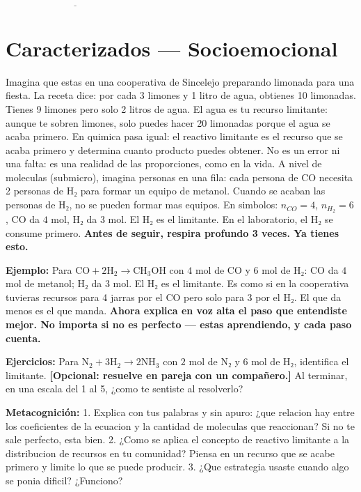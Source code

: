 \documentclass[
  spanish,
  letterpaper,
  12pt,
  oneside,
  open=any]{scrbook}
\newcommand{\setcolorsection}[2]{%
  \definecolor{currentsectionbg}{HTML}{#1}%
  \definecolor{currentsectionborder}{HTML}{#2}%
}
\begin{document}
\(\underline{\hspace{6cm}}\)

\setcolorsection{d6c7e7}{c0b0d8}

\section{Caracterizados ---
Socioemocional}\label{caracterizados-socioemocional}

Imagina que estas en una cooperativa de Sincelejo preparando limonada
para una fiesta. La receta dice: por cada 3 limones y 1 litro de agua,
obtienes 10 limonadas. Tienes 9 limones pero solo 2 litros de agua. El
agua es tu recurso limitante: aunque te sobren limones, solo puedes
hacer 20 limonadas porque el agua se acaba primero. En quimica pasa
igual: el reactivo limitante es el recurso que se acaba primero y
determina cuanto producto puedes obtener. No es un error ni una falta:
es una realidad de las proporciones, como en la vida. A nivel de
moleculas (submicro), imagina personas en una fila: cada persona de CO
necesita 2 personas de H₂ para formar un equipo de metanol. Cuando se
acaban las personas de H₂, no se pueden formar mas equipos. En simbolos:
\(n_{CO} = 4\), \(n_{H_2} = 6\), CO da \(4\) mol, H₂ da \(3\) mol. El H₂
es el limitante. En el laboratorio, el H₂ se consume primero.
\textbf{Antes de seguir, respira profundo 3 veces. Ya tienes esto.}

\textbf{Ejemplo:} Para
\(\text{CO} + 2\text{H}_2 \rightarrow \text{CH}_3\text{OH}\) con \(4\)
mol de CO y \(6\) mol de H₂: CO da \(4\) mol de metanol; H₂ da \(3\)
mol. El H₂ es el limitante. Es como si en la cooperativa tuvieras
recursos para 4 jarras por el CO pero solo para 3 por el H₂. El que da
menos es el que manda. \textbf{Ahora explica en voz alta el paso que
entendiste mejor. No importa si no es perfecto --- estas aprendiendo, y
cada paso cuenta.}

\textbf{Ejercicios:} Para
\(\text{N}_2 + 3\text{H}_2 \rightarrow 2\text{NH}_3\) con \(2\) mol de
N₂ y \(6\) mol de H₂, identifica el limitante. \textbf{{[}Opcional:
resuelve en pareja con un compañero.{]}} Al terminar, en una escala del
1 al 5, ¿como te sentiste al resolverlo?

\textbf{Metacognición:} 1. Explica con tus palabras y sin apuro: ¿que
relacion hay entre los coeficientes de la ecuacion y la cantidad de
moleculas que reaccionan? Si no te sale perfecto, esta bien. 2. ¿Como se
aplica el concepto de reactivo limitante a la distribucion de recursos
en tu comunidad? Piensa en un recurso que se acabe primero y limite lo
que se puede producir. 3. ¿Que estrategia usaste cuando algo se ponia
dificil? ¿Funciono?
\end{document}
